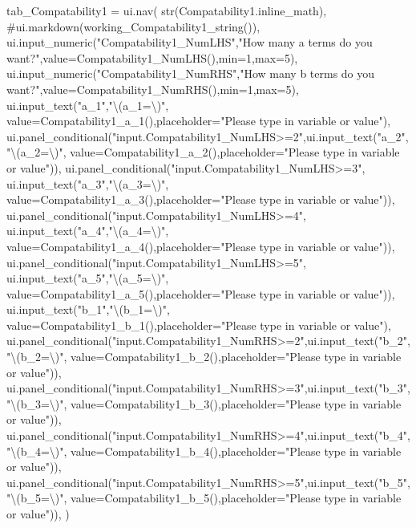 \documentclass[
  letterpaper,
  DIV=11,
  numbers=noendperiod]{scrreprt}
\newenvironment{Shaded}{\begin{snugshade}}{\end{snugshade}}
\newcommand{\NormalTok}[1]{\textcolor[rgb]{0.00,0.23,0.31}{#1}}
\begin{document}
\begin{Shaded}
\begin{Highlighting}[]
\NormalTok{        tab\_Compatability1 = ui.nav(}
\NormalTok{                str(Compatability1.inline\_math),}
\NormalTok{                \#ui.markdown(working\_Compatability1\_string()),}
\NormalTok{                ui.input\_numeric("Compatability1\_NumLHS","How many \textquotesingle{}a\textquotesingle{} terms do you want?",value=Compatability1\_NumLHS(),min=1,max=5),}
\NormalTok{                ui.input\_numeric("Compatability1\_NumRHS","How many \textquotesingle{}b\textquotesingle{} terms do you want?",value=Compatability1\_NumRHS(),min=1,max=5),}
\NormalTok{                ui.input\_text("a\_1","\textbackslash{}(a\_1=\textbackslash{})", value=Compatability1\_a\_1(),placeholder="Please type in variable or value"),}
\NormalTok{                ui.panel\_conditional("input.Compatability1\_NumLHS\textgreater{}=2",ui.input\_text("a\_2","\textbackslash{}(a\_2=\textbackslash{})", value=Compatability1\_a\_2(),placeholder="Please type in variable or value")),}
\NormalTok{                ui.panel\_conditional("input.Compatability1\_NumLHS\textgreater{}=3", ui.input\_text("a\_3","\textbackslash{}(a\_3=\textbackslash{})", value=Compatability1\_a\_3(),placeholder="Please type in variable or value")),}
\NormalTok{                ui.panel\_conditional("input.Compatability1\_NumLHS\textgreater{}=4", ui.input\_text("a\_4","\textbackslash{}(a\_4=\textbackslash{})", value=Compatability1\_a\_4(),placeholder="Please type in variable or value")),}
\NormalTok{                ui.panel\_conditional("input.Compatability1\_NumLHS\textgreater{}=5", ui.input\_text("a\_5","\textbackslash{}(a\_5=\textbackslash{})", value=Compatability1\_a\_5(),placeholder="Please type in variable or value")),}
\NormalTok{                ui.input\_text("b\_1","\textbackslash{}(b\_1=\textbackslash{})", value=Compatability1\_b\_1(),placeholder="Please type in variable or value"),}
\NormalTok{                ui.panel\_conditional("input.Compatability1\_NumRHS\textgreater{}=2",ui.input\_text("b\_2","\textbackslash{}(b\_2=\textbackslash{})", value=Compatability1\_b\_2(),placeholder="Please type in variable or value")),}
\NormalTok{                ui.panel\_conditional("input.Compatability1\_NumRHS\textgreater{}=3",ui.input\_text("b\_3","\textbackslash{}(b\_3=\textbackslash{})", value=Compatability1\_b\_3(),placeholder="Please type in variable or value")),}
\NormalTok{                ui.panel\_conditional("input.Compatability1\_NumRHS\textgreater{}=4",ui.input\_text("b\_4","\textbackslash{}(b\_4=\textbackslash{})", value=Compatability1\_b\_4(),placeholder="Please type in variable or value")),}
\NormalTok{                ui.panel\_conditional("input.Compatability1\_NumRHS\textgreater{}=5",ui.input\_text("b\_5","\textbackslash{}(b\_5=\textbackslash{})", value=Compatability1\_b\_5(),placeholder="Please type in variable or value")),}
\NormalTok{                )}
        

\end{Highlighting}
\end{Shaded}
\end{document}
